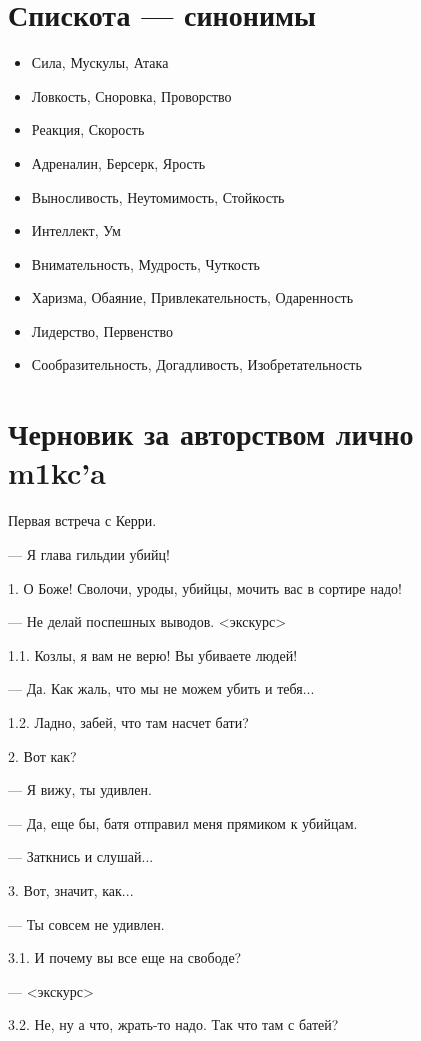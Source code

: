 \documentclass[12pt,a4paper]{book}
\begin{document}
\section*{Спискота --- синонимы}

\begin{itemize}
\item Сила, Мускулы, Атака
\item Ловкость, Сноровка, Проворство
\item Реакция, Скорость
\item Адреналин, Берсерк, Ярость
\item Выносливость, Неутомимость, Стойкость
\item Интеллект, Ум
\item Внимательность, Мудрость, Чуткость
\item Харизма, Обаяние, Привлекательность, Одаренность
\item Лидерство, Первенство
\item Сообразительность, Догадливость, Изобретательность
\end{itemize}

\section*{Черновик за авторством лично m1kc'a}

Первая встреча с Керри.

--- Я глава гильдии убийц!

1. О Боже! Сволочи, уроды, убийцы, мочить вас в сортире надо!

--- Не делай поспешных выводов. <экскурс>

1.1. Козлы, я вам не верю! Вы убиваете людей!

--- Да. Как жаль, что мы не можем убить и тебя...

1.2. Ладно, забей, что там насчет бати?

2. Вот как?

--- Я вижу, ты удивлен.

--- Да, еще бы, батя отправил меня прямиком к убийцам.

--- Заткнись и слушай...

3. Вот, значит, как...

--- Ты совсем не удивлен.

3.1. И почему вы все еще на свободе? 

--- <экскурс>

3.2. Не, ну а что, жрать-то надо. Так что там с батей?
\end{document}
